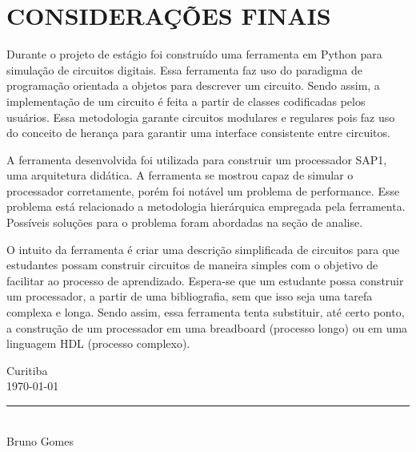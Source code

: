 \section{CONSIDERAÇÕES FINAIS}
Durante o projeto de estágio foi construído uma ferramenta em Python para simulação de circuitos digitais.
Essa ferramenta faz uso do paradigma de programação orientada a objetos para descrever um circuito.
Sendo assim, a implementação de um circuito é feita a partir de classes codificadas pelos usuários.
Essa metodologia garante circuitos modulares e regulares pois faz uso do conceito de herança para garantir uma interface consistente entre circuitos.

A ferramenta desenvolvida foi utilizada para construir um processador SAP1, uma arquitetura didática.
A ferramenta se mostrou capaz de simular o processador corretamente, porém foi notável um problema de performance.
Esse problema está relacionado a metodologia hierárquica empregada pela ferramenta.
Possíveis soluções para o problema foram abordadas na seção de analise.

O intuito da ferramenta é criar uma descrição simplificada de circuitos para que estudantes possam construir circuitos de maneira simples com o objetivo de facilitar ao processo de aprendizado.
Espera-se que um estudante possa construir um processador, a partir de uma bibliografia, sem que isso seja uma tarefa complexa e longa.
Sendo assim, essa ferramenta tenta substituir, até certo ponto, a construção de um processador em uma breadboard (processo longo) ou em uma linguagem HDL (processo complexo).

\begin{flushright}
\vspace{3cm}
Curitiba\\
\today\\
\vspace{3cm}
\noindent \rule{0.5\textwidth}{0.4pt}\\
Bruno Gomes\\
\end{flushright}
